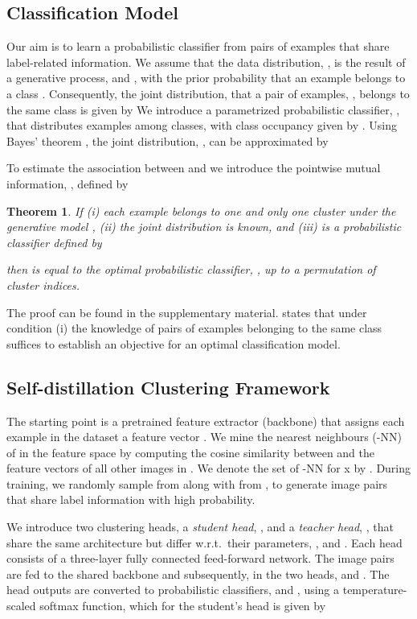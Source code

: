 \documentclass{bmvc2k}
\newtheorem{theorem}{Theorem}
\begin{document}
\subsection{Classification Model}
\label{subsec:mi-objective}
Our aim is to learn a probabilistic classifier from pairs of examples that share label-related information. 
We assume that the data distribution, , is the result of a generative process,  and , with  the prior probability that an example belongs to a class . Consequently, the joint distribution,  that a pair of examples, , belongs to the same class is given by 
We introduce a parametrized probabilistic classifier, , that distributes examples  among classes, with class occupancy given by . Using Bayes' theorem , the joint distribution, , can be approximated by 

To estimate the association between  and  we introduce the pointwise mutual information,  \cite{church1990word}, defined by

 
\begin{theorem}
\label{thm:optimal}
    If (i) each example  belongs to one and only one cluster under the generative model , (ii) the joint distribution  is known, and (iii)  is a probabilistic classifier defined by
    
    then  is equal to the optimal probabilistic classifier, , up to a permutation of cluster indices.
\end{theorem}
The proof can be found in the supplementary material.  states that under condition (i) the knowledge of pairs of examples belonging to the same class suffices to establish an objective for an optimal classification model.


\subsection{Self-distillation Clustering Framework} 
The starting point is a pretrained feature extractor (backbone)  that assigns each example  in the dataset  a feature vector . We mine the  nearest neighbours (-NN) of  in the feature space by computing the cosine similarity between  and the feature vectors of all other images in . We denote the set of -NN for x by . During training, we randomly sample  from  along with  from , to generate image pairs that share label information with high probability.

We introduce two clustering heads, a \emph{student head}, , and a \emph{teacher head}, , that share the same architecture but differ w.r.t.\ their parameters, , and . Each head consists of a three-layer fully connected feed-forward network. The image pairs  are fed to the shared backbone and subsequently, in the two heads,  and . The head outputs are converted to probabilistic classifiers,  and , using a temperature-scaled softmax function, which for the student's head is given by
\end{document}

